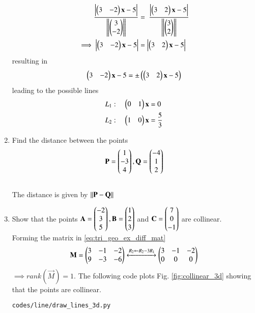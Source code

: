 \begin{enumerate}[label=\arabic*.,ref=\thesubsection.\theenumi]
%
\begin{align}
\frac{\left\vert\begin{pmatrix}3 & -2\end{pmatrix}\mathbf{x}  - 5\right\vert}{\left\lVert\begin{pmatrix}3 \\ -2\end{pmatrix}\right\rVert}
&=\
\frac{\left\vert\begin{pmatrix}3 & 2\end{pmatrix}\mathbf{x}  - 5\right\vert}{\left\lVert\begin{pmatrix}3 \\ 2\end{pmatrix}\right\rVert}
\\
\implies \left\vert\begin{pmatrix}3 & -2\end{pmatrix}\mathbf{x}  - 5\right\vert&=\left\vert\begin{pmatrix}3 & 2\end{pmatrix}\mathbf{x}  - 5\right\vert
\end{align}
%
resulting in 
%
\begin{align}
\begin{pmatrix}3 & -2\end{pmatrix}\mathbf{x}  - 5=\pm\left(\begin{pmatrix}3 & 2\end{pmatrix}\mathbf{x}  - 5\right)
\end{align}
%
leading to the possible lines
%
\begin{align}
L_1: \quad \begin{pmatrix}0 & 1\end{pmatrix}\mathbf{x}  &=0
\\
L_2: \quad \begin{pmatrix}1 & 0\end{pmatrix}\mathbf{x}  &=  \frac{5}{3}
\end{align}
%
\item Find the distance between the points
%
\begin{align}
\mathbf{P} = \begin{pmatrix}1\\-3\\4\end{pmatrix},
\mathbf{Q} = \begin{pmatrix}-4\\1\\2\end{pmatrix}
\end{align}
%
\solution 
\\

The distance is given by $\left\lVert\mathbf{P}-\mathbf{Q}\right\rVert$
\item Show that the points 
\label{prob:line_coll_3d}
$
\mathbf{A}=\begin{pmatrix}-2\\3\\5\end{pmatrix}, 
\mathbf{B}=\begin{pmatrix}1\\2\\3\end{pmatrix}$ 
and 
$ \mathbf{C}=\begin{pmatrix}7\\0\\-1\end{pmatrix}$ 
are collinear.
%
\\
\solution Forming the matrix in \eqref{eq:tri_geo_ex_diff_mat}
%
\begin{align}
\mathbf{M} = \begin{pmatrix}
3 & -1 & -2
\\
9 & -3 & -6
\end{pmatrix}
\xleftrightarrow {R_2\leftarrow R_2-3R_1}
\begin{pmatrix}
3 & -1 & -2
\\
0 & 0 & 0
\end{pmatrix}
\end{align}
%
$\implies rank(\vec{M}) = 1$.
%
The following code plots Fig. \ref{fig:collinear_3d} showing that the points are collinear.
%
\begin{lstlisting}
codes/line/draw_lines_3d.py
\end{lstlisting}

\end{enumerate}
